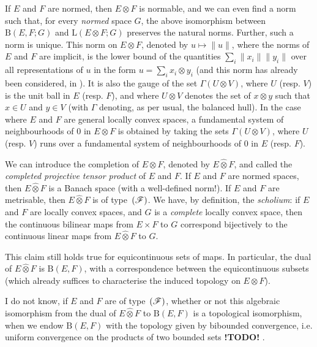 \documentclass{article}
\theoremstyle{plain}
\newcommand{\BB}{\mathrm{B}}
\newcommand{\LL}{\mathrm{L}}
\newcommand{\FF}{\mbox{\normalfont($\mathscr{F}$)}}
\newcommand{\hotimes}{\widehat{\otimes}}
\newcommand{\todo}{\textbf{ !TODO! }}
\newcommand{\oldpage}[1]{\marginpar{\footnotesize$\Big\vert$ \textit{p.~#1}}}
\begin{document}
If $E$ and $F$ are normed, then $E\otimes F$ is normable, and we can even find a norm such that, for every \emph{normed} space $G$, the above isomorphism between $\BB(E,F;G)$ and $\LL(E\otimes F;G)$ preserves the natural norms.
Further, such a norm is unique.
This norm on $E\otimes F$, denoted by $u\mapsto\|u\|$, where the norms of $E$ and $F$ are implicit, is the lower bound of the quantities $\sum_i\|x_i\|\|y_i\|$ over all representations of $u$ in the form $u=\sum_i x_i\otimes y_i$ (and this norm has already been considered, in \cite{8}).
It is also the gauge of the set $\Gamma(U\otimes V)$, where $U$ (resp. $V$) is the unit ball in $E$ (resp. $F$), and where $U\otimes V$ denotes the set of $x\otimes y$ such that $x\in U$ and $y\in V$
\oldpage{77}
(with $\Gamma$ denoting, as per usual, the balanced hull).
In the case where $E$ and $F$ are general locally convex spaces, a fundamental system of neighbourhoods of $0$ in $E\otimes F$ is obtained by taking the sets $\Gamma(U\otimes V)$, where $U$ (resp. $V$) runs over a fundamental system of neighbourhoods of $0$ in $E$ (resp. $F$).

We can introduce the completion of $E\otimes F$, denoted by $E\hotimes F$, and called the \emph{completed projective tensor product} of $E$ and $F$.
If $E$ and $F$ are normed spaces, then $E\hotimes F$ is a Banach space (with a well-defined norm!).
If $E$ and $F$ are metrisable, then $E\hotimes F$ is of type~$\FF$.
We have, by definition, the \emph{scholium}: if $E$ and $F$ are locally convex spaces, and $G$ is a \emph{complete} locally convex space, then the continuous bilinear maps from $E\times F$ to $G$ correspond bijectively to the continuous linear maps from $E\hotimes F$ to $G$.

This claim still holds true for equicontinuous sets of maps.
In particular, the dual of $E\hotimes F$ is $\BB(E,F)$, with a correspondence between the equicontinuous subsets (which already suffices to characterise the induced topology on $E\otimes F$).

I do not know, if $E$ and $F$ are of type~$\FF$, whether or not this algebraic isomorphism from the dual of $E\hotimes F$ to $\BB(E,F)$ is a topological isomorphism, when we endow $\BB(E,F)$ with the topology given by bibounded convergence, i.e. uniform convergence on the products of two bounded sets \todo.



\nocite{*}
\end{document}
